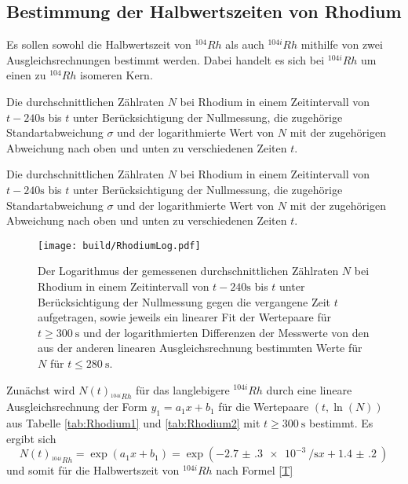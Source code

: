 \subsection{Bestimmung der Halbwertszeiten von Rhodium}
Es sollen sowohl die Halbwertszeit von $^{104} Rh$ als auch $^{104i} Rh$ mithilfe von zwei Ausgleichsrechnungen bestimmt werden. Dabei handelt es sich bei $^{104i} Rh$ um einen zu $^{104} Rh$ isomeren Kern.
 \begin{table}
	\centering
	\caption{Die durchschnittlichen Zählraten $N$ bei Rhodium in einem Zeitintervall von $t-240\si{\second}$ bis $t$ unter Berücksichtigung der Nullmessung, die zugehörige Standartabweichung $\sigma$ und der logarithmierte Wert von $N$ mit der zugehörigen Abweichung nach oben und unten zu verschiedenen Zeiten $t$.}
	
\end{table}
\begin{table}
	\centering
	\caption{Die durchschnittlichen Zählraten $N$ bei Rhodium in einem Zeitintervall von $t-240\si{\second}$ bis $t$ unter Berücksichtigung der Nullmessung, die zugehörige Standartabweichung $\sigma$ und der logarithmierte Wert von $N$ mit der zugehörigen Abweichung nach oben und unten zu verschiedenen Zeiten $t$.}
	
\end{table}
\begin{figure}
	\centering
	\caption{Der Logarithmus der gemessenen durchschnittlichen Zählraten $N$ bei Rhodium in einem Zeitintervall von $t-240\si{\second}$ bis $t$ unter Berücksichtigung der Nullmessung gegen die vergangene Zeit $t$ aufgetragen, sowie jeweils ein linearer Fit der Wertepaare für $t\ge \SI{300}{\second}$ und der logarithmierten Differenzen der Messwerte von den aus der anderen linearen Ausgleichsrechnung bestimmten Werte für $N$ für $t\le \SI{280}{\second}$.}
	\texttt{[image: build/RhodiumLog.pdf]}
	\label{fig:Rhodium}
\end{figure}
Zunächst wird $N(t)_{^{104i}Rh}$ für das langlebigere $^{104i} Rh$ durch eine lineare Ausgleichsrechnung der Form $y_1=a_1 x+b_1$ für die Wertepaare $(t,\ln(N))$ aus Tabelle \ref{tab:Rhodium1} und \ref{tab:Rhodium2} mit $t\ge \SI{300}{\second}$ bestimmt.
Es ergibt sich
\begin{displaymath}
	N(t)_{^{104i}Rh} = \exp\left(a_1 x + b_1\right) = \exp\left(-\SI{2.7(3)e-3}{\per\second} x + \SI{1.4(2)}{}\right)
\end{displaymath}
und somit für die Halbwertszeit von $^{104i} Rh$ nach Formel \eqref{T}

